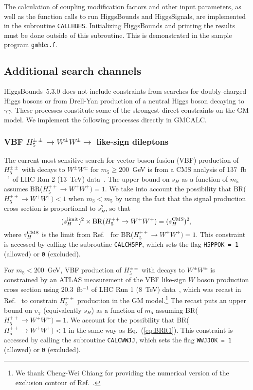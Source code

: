\documentclass[11pt]{article}
\begin{document}
The calculation of coupling modification factors and other input parameters, as well as the function calls to run HiggsBounds and HiggsSignals, are implemented in the subroutine {\tt CALLHBHS}. Initializing HiggsBounds and printing the results must be done outside of this subroutine. This is demonstrated in the sample program {\tt gmhb5.f}.

\subsection{Additional search channels}

HiggsBounds~5.3.0 does not include constraints from searches for doubly-charged Higgs bosons or from Drell-Yan production of a neutral Higgs boson decaying to $\gamma\gamma$.  These processes constitute some of the strongest direct constraints on the GM model.  We implement the following processes directly in GMCALC.  

\subsubsection{VBF $H_5^{\pm\pm} \to W^{\pm} W^{\pm} \to$ like-sign dileptons}

The current most sensitive search for vector boson fusion (VBF) production of $H_5^{\pm\pm}$ with decays to $W^{\pm}W^{\pm}$ for $m_5 \geq 200$~GeV is from a CMS analysis of 137~fb$^{-1}$ of LHC Run 2 (13~TeV) data~\cite{CMS:2021wlt}.  The upper bound on $s_H$ as a function of $m_5$ assumes BR($H_5^{++} \to W^+W^+) = 1$.  We take into account the possibility that BR($H_5^{++} \to W^+W^+) < 1$ when $m_3 < m_5$ by using the fact that the signal production cross section is proportional to $s_H^2$, so that
\begin{equation}
	(s_H^{\rm limit})^2 \times {\rm BR}(H_5^{++} \to W^+W^+) = (s_H^{\rm CMS})^2,
	\label{eq:BRlt1}
\end{equation}
where $s_H^{\rm CMS}$ is the limit from Ref.~\cite{CMS:2021wlt} for BR($H_5^{++} \to W^+W^+) = 1$.  This constraint is accessed by calling the subroutine {\tt CALCH5PP}, which sets the flag {\tt H5PPOK = 1} (allowed) or {\tt 0} (excluded).

For $m_5 < 200$~GeV, VBF production of $H_5^{\pm\pm}$ with decays to $W^{\pm}W^{\pm}$ is constrained by an ATLAS measurement of the VBF like-sign $W$ boson production cross section using 20.3~fb$^{-1}$ of LHC Run 1 (8~TeV) data~\cite{Aad:2014zda}, which was recast in Ref.~\cite{Chiang:2014bia} to constrain $H_5^{\pm\pm}$ production in the GM model.\footnote{We thank Cheng-Wei Chiang for providing the numerical version of the exclusion contour of Ref.~\cite{Chiang:2014bia}.}  The recast puts an upper bound on $v_{\chi}$ (equivalently $s_H$) as a function of $m_5$ assuming BR($H_5^{++} \to W^+W^+) = 1$.  We account for the possibility that BR($H_5^{++} \to W^+W^+) < 1$ in the same way as Eq.~(\ref{eq:BRlt1}).  This constraint is accessed by calling the subroutine {\tt CALCWWJJ}, which sets the flag {\tt WWJJOK = 1} (allowed) or {\tt 0} (excluded).
\end{document}
